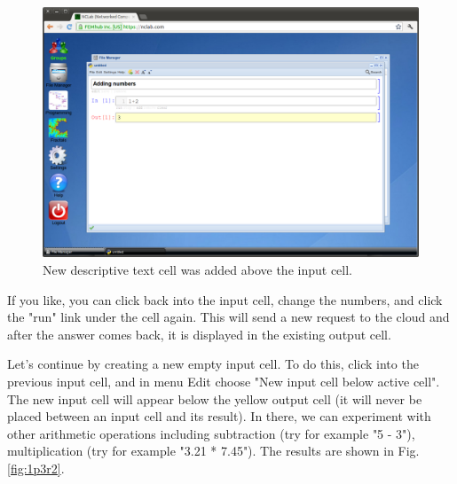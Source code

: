 \documentclass[article,A4,12pt]{llncs}
\begin{document}
\begin{figure}[!ht]
\begin{center}
\includegraphics[width=\textwidth]{img/1p3r.png}
\end{center}
\caption{New descriptive text cell was added above the input cell.}
\label{fig:1p3r}
\end{figure}
\noindent
\noindent
If you like, you can click back into the input cell, change 
the numbers, and click the "run" link under the cell again. 
This will send a new request to the cloud and after the answer 
comes back, it is displayed in the existing output 
cell. 

Let's continue by creating a new empty input cell. To do this, click
into the previous input cell, and in menu Edit choose "New input cell 
below active cell". The new input cell will appear below the yellow 
output cell (it will never be placed between an input cell and its 
result). In there, we can experiment with other arithmetic operations 
including subtraction (try for example "5 - 3"), multiplication 
(try for example "3.21 * 7.45"). The results are shown in Fig. \ref{fig:1p3r2}.
\end{document}
